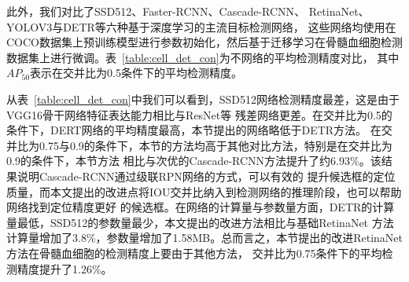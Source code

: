 此外，我们对比了SSD512\cite{liu2016ssd}、Faster-RCNN\cite{ren2015faster}、Cascade-RCNN\cite{cai2018cascade}、
RetinaNet\cite{lin2017focal}、YOLOV3\cite{redmon2018yolov3}与DETR\cite{zhu2020deformable}等六种基于深度学习的主流目标检测网络，
这些网络均使用在COCO数据集上预训练模型进行参数初始化，然后基于迁移学习在骨髓血细胞检测数据集上进行微调。表~\ref{table:cell_det_con}为不网络的平均检测精度对比，
其中$AP_{50}$表示在交并比为0.5条件下的平均检测精度。

从表~\ref{table:cell_det_con}中我们可以看到，SSD512网络检测精度最差，这是由于VGG16骨干网络特征表达能力相比与ResNet等
残差网络更差。在交并比为0.5的条件下，DERT网络的平均精度最高，本节提出的网络略低于DETR方法。
在交并比为0.75与0.9的条件下，本节的方法均高于其他对比方法，特别是在交并比为0.9的条件下，本节方法 
相比与次优的Cascade-RCNN方法提升了约6.93\%。该结果说明Cascade-RCNN通过级联RPN网络的方式，可以有效的
提升候选框的定位质量，而本文提出的改进点将IOU交并比纳入到检测网络的推理阶段，也可以帮助网络找到定位精度更好
的候选框。在网络的计算量与参数量方面，DETR的计算量最低，SSD512的参数量最少，本文提出的改进方法相比与基础RetinaNet
方法计算量增加了3.8\%，参数量增加了1.58MB。总而言之，本节提出的改进RetinaNet方法在骨髓血细胞的检测精度上要由于其他方法，
交并比为0.75条件下的平均检测精度提升了1.26\%。

